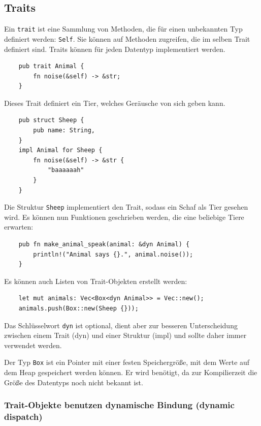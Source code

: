 \subsection{Traits}

Ein \verb"trait" ist eine Sammlung von Methoden, die für einen unbekannten Typ definiert werden: \verb"Self". Sie können auf Methoden zugreifen, die im selben Trait definiert sind. Traits können für jeden Datentyp implementiert werden. \cite{RustExample}

\begin{lstlisting}
    pub trait Animal {
        fn noise(&self) -> &str;
    }
\end{lstlisting}

Dieses Trait definiert ein Tier, welches Geräusche von sich geben kann.

\begin{lstlisting}
    pub struct Sheep {
        pub name: String,
    }
    impl Animal for Sheep {
        fn noise(&self) -> &str {
            "baaaaaah"
        }
    }
\end{lstlisting}

Die Struktur \verb"Sheep" implementiert den Trait, sodass ein Schaf als Tier gesehen wird. Es können nun Funktionen geschrieben werden, die eine beliebige Tiere erwarten:

\begin{lstlisting}
    pub fn make_animal_speak(animal: &dyn Animal) {
        println!("Animal says {}.", animal.noise());
    }
\end{lstlisting}

Es können auch Listen von Trait-Objekten erstellt werden:

\begin{lstlisting}
    let mut animals: Vec<Box<dyn Animal>> = Vec::new();
    animals.push(Box::new(Sheep {}));
\end{lstlisting}

Das Schlüsselwort \verb"dyn" ist optional, dient aber zur besseren Unterscheidung zwi\-schen einem Trait (dyn) und einer Struktur (impl) und sollte daher immer verwendet werden.

Der Typ \verb"Box" ist ein Pointer mit einer festen Speichergröße, mit dem Werte auf dem Heap gespeichert werden können. Er wird benötigt, da zur Kompilierzeit die Größe des Datentyps noch nicht bekannt ist.

\subsubsection{Trait-Objekte benutzen dynamische Bindung (dynamic dispatch)}\label{dynamicdispatch}

